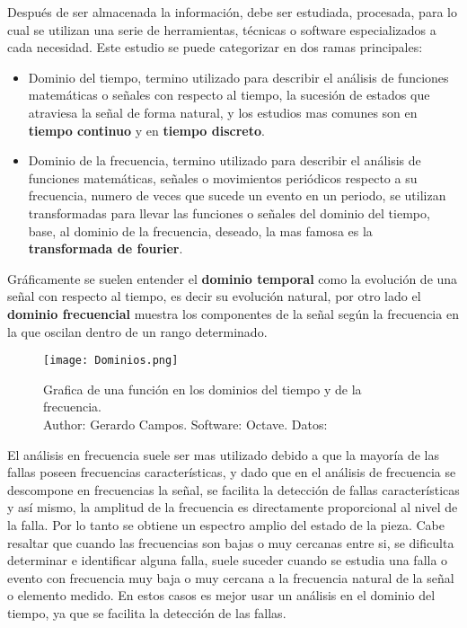 Después de ser almacenada la información, debe ser estudiada, procesada, para lo
cual se utilizan una serie de herramientas, técnicas o software especializados
a cada necesidad. Este estudio se puede categorizar en dos ramas principales:

\begin{itemize}
    \item Dominio del tiempo, termino utilizado para describir el análisis
        de funciones matemáticas o señales con respecto al tiempo, la sucesión
        de estados que atraviesa la señal de forma natural, y los estudios mas
        comunes son en  \textbf{tiempo continuo} y en \textbf{tiempo discreto}.

    \item Dominio de la frecuencia, termino utilizado para describir el análisis
        de funciones matemáticas, señales o movimientos periódicos respecto a
        su frecuencia, numero de veces que sucede un evento en un periodo, se
        utilizan transformadas para llevar las funciones o señales del dominio
        del tiempo, base, al dominio de la frecuencia, deseado, la mas famosa es
        la \textbf{transformada de fourier}.
\end{itemize}


Gráficamente se suelen entender el \textbf{dominio temporal} como la evolución
de una señal con respecto al tiempo, es decir su evolución natural, por otro
lado el \textbf{dominio frecuencial} muestra los componentes de la señal según
la frecuencia en la que oscilan dentro de un rango determinado.

	\begin{figure}[htb]
		\centering
		\caption{Grafica de una función en los dominios del tiempo y de la
                frecuencia.\\ Author: Gerardo Campos. \hspace{0.5cm}
                Software: Octave. \hspace{0.5cm}
                Datos: \Cite{HUANG20181745}
        }
		\label{Dominios }
        \texttt{[image: Dominios.png]}
	\end{figure}


El análisis en frecuencia suele ser mas utilizado debido a que
la mayoría de las fallas poseen frecuencias características, y dado que en  el
análisis de frecuencia se descompone en frecuencias la señal, se facilita la
detección de fallas características y así mismo, la amplitud de la frecuencia es
directamente proporcional al nivel de la falla. Por lo tanto se obtiene un
espectro amplio del estado de la pieza.
Cabe resaltar que cuando las frecuencias son bajas o muy cercanas entre si,
se dificulta determinar e identificar alguna falla, suele suceder cuando se
estudia una falla o evento con frecuencia muy baja o muy cercana a la frecuencia
natural de la señal o elemento medido. En estos casos es mejor
usar un análisis en el dominio del tiempo, ya que se facilita la
detección de las fallas.



